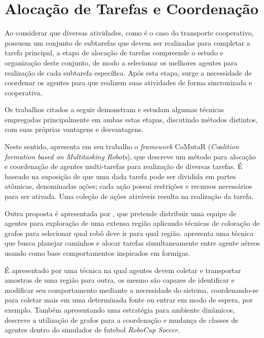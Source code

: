 \section{Alocação de Tarefas e Coordenação} %
\label{sec:t_cnicas_de_aloca_o_de_tarefas}

Ao considerar que diversas atividades, como é o caso do transporte cooperativo, possuem um conjunto de subtarefas que devem ser realizadas para completar a tarefa principal, a etapa de alocação de tarefas compreende o estudo e organização deste conjunto, de modo a selecionar os melhores agentes para realização de cada subtarefa específica.
Após esta etapa, surge a necessidade de coordenar os agentes para que realizem suas atividades de forma sincronizada e cooperativa.

Os trabalhos citados a seguir demonstram e estudam algumas técnicas empregadas principalmente em ambas estas etapas, discutindo métodos distintos, com suas próprias vantagens e desvantagens.

Neste sentido, \cite{Shiroma2009} apresenta em seu trabalho o \textit{framework} CoMutaR (\emph{Coalition formation based on Multitasking Robots}), que descreve um método para alocação e coordenação de agentes multi-tarefas para realização de diversas tarefas.
É baseado na suposição de que uma dada tarefa pode ser dividida em partes atômicas, denominadas ações; cada ação possui restrições e recursos necessários para ser ativada. Uma coleção de ações ativáveis resulta na realização da tarefa.

Outra proposta é apresentada por \cite{Carvalho2013}, que pretende distribuir uma equipe de agentes para exploração de uma extensa região aplicando técnicas de coloração de grafos para selecionar qual robô deve ir para qual região.
\cite{Kulatunga2006} apresenta uma técnica que busca planejar caminhos e alocar tarefas simultaneamente entre agente aéreos usando como base comportamentos inspirados em formigas.

É apresentado por \cite{Tiganas2013} uma técnica na qual agentes devem coletar e transportar amostras de uma região para outra, os mesmo são capazes de identificar e modificar seu comportamento mediante a necessidade do sistema, coordenando-se para coletar mais em uma determinada fonte ou entrar em modo de espera, por exemplo.
Também apresentando uma estratégia para ambiente dinâmicos, \cite{Wang2009} descreve a utilização de grafos para a coordenação e mudança de classes de agentes dentro do simulador de futebol \emph{RoboCup Soccer}.

